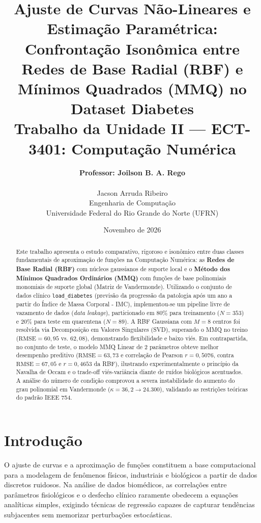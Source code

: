 \documentclass[12pt,a4paper]{article}
\title{
\vspace{-2em}
\textbf{Ajuste de Curvas Não-Lineares e Estimação Paramétrica: \\
Confrontação Isonômica entre Redes de Base Radial (RBF) e Mínimos Quadrados (MMQ) no Dataset Diabetes}
\vspace{0.5em} \\
\large Trabalho da Unidade II — ECT-3401: Computação Numérica}
\author{
\textbf{Professor: Joilson B. A. Rego}\\
\vspace{0.5em} \\ 
Jacson Arruda Ribeiro \\
Engenharia de Computação \\
Universidade Federal do Rio Grande do Norte (UFRN)
}
\date{Novembro de 2026}
\begin{document}
\maketitle

\begin{abstract}
Este trabalho apresenta o estudo comparativo, rigoroso e isonômico entre duas classes fundamentais de aproximação de funções na Computação Numérica: as \textbf{Redes de Base Radial (RBF)} com núcleos gaussianos de suporte local e o \textbf{Método dos Mínimos Quadrados Ordinários (MMQ)} com funções de base polinomiais monomiais de suporte global (Matriz de Vandermonde). Utilizando o conjunto de dados clínico \texttt{load\_diabetes} (previsão da progressão da patologia após um ano a partir do Índice de Massa Corporal - IMC), implementou-se um pipeline livre de vazamento de dados (\textit{data leakage}), particionado em 80\% para treinamento ($N=353$) e 20\% para teste em quarentena ($N=89$). A RBF Gaussiana com $M=8$ centros foi resolvida via Decomposição em Valores Singulares (SVD), superando o MMQ no treino ($\text{RMSE} = 60{,}95$ vs. $62{,}08$), demonstrando flexibilidade e baixo viés. Em contrapartida, no conjunto de teste, o modelo MMQ Linear de 2 parâmetros obteve melhor desempenho preditivo ($\text{RMSE} = 63{,}73$ e correlação de Pearson $r = 0{,}5076$, contra $\text{RMSE} = 67{,}05$ e $r = 0{,}4653$ da RBF), ilustrando experimentalmente o princípio da Navalha de Occam e o trade-off viés-variância diante de ruídos biológicos acentuados. A análise do número de condição comprovou a severa instabilidade do aumento do grau polinomial em Vandermonde ($\kappa = 36{,}2 \to 24.300$), validando as restrições teóricas do padrão IEEE 754.
\end{abstract}

\section{Introdução}
O ajuste de curvas e a aproximação de funções constituem a base computacional para a modelagem de fenômenos físicos, industriais e biológicos a partir de dados discretos ruidosos. Na análise de dados biomédicos, as correlações entre parâmetros fisiológicos e o desfecho clínico raramente obedecem a equações analíticas simples, exigindo técnicas de regressão capazes de capturar tendências subjacentes sem memorizar perturbações estocásticas.
\end{document}
